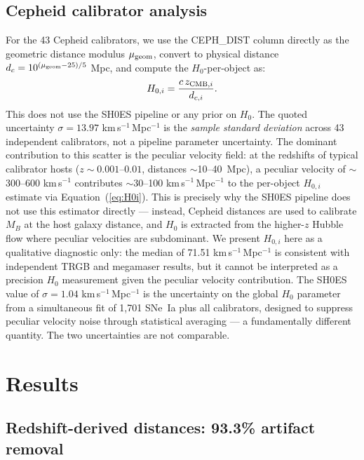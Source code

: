 \documentclass[usenatbib]{mnras}
\begin{document}
\subsection{Cepheid calibrator analysis}

For the 43 Cepheid calibrators, we use the CEPH\_DIST column directly
as the geometric distance modulus $\mu_{\rm geom}$, convert to physical
distance $d_c = 10^{(\mu_{\rm geom}-25)/5}$ Mpc, and compute the
$H_0$-per-object as:
\begin{equation}
H_{0,i} = \frac{c\,z_{{\rm CMB},i}}{d_{c,i}}.
\label{eq:H0i}
\end{equation}
This does not use the SH0ES pipeline or any prior on $H_0$. The quoted
uncertainty $\sigma = 13.97$ km\,s$^{-1}$\,Mpc$^{-1}$ is the
\emph{sample standard deviation} across 43 independent calibrators,
not a pipeline parameter uncertainty. The dominant contribution to
this scatter is the peculiar velocity field: at the redshifts of
typical calibrator hosts ($z \sim 0.001$--$0.01$, distances
$\sim$10--40~Mpc), a peculiar velocity of $\sim$300--600 km\,s$^{-1}$
contributes $\sim$30--100 km\,s$^{-1}$\,Mpc$^{-1}$ to the per-object
$H_{0,i}$ estimate via Equation~(\ref{eq:H0i}). This is precisely why
the SH0ES pipeline does not use this estimator directly --- instead,
Cepheid distances are used to calibrate $M_B$ at the host galaxy
distance, and $H_0$ is extracted from the higher-$z$ Hubble flow where
peculiar velocities are subdominant. We present $H_{0,i}$ here as a
qualitative diagnostic only: the median of 71.51 km\,s$^{-1}$\,Mpc$^{-1}$
is consistent with independent TRGB and megamaser results, but it
cannot be interpreted as a precision $H_0$ measurement given the
peculiar velocity contribution. The SH0ES value of
$\sigma = 1.04$ km\,s$^{-1}$\,Mpc$^{-1}$ is the uncertainty on the
global $H_0$ parameter from a simultaneous fit of 1,701 SNe~Ia plus
all calibrators, designed to suppress peculiar velocity noise through
statistical averaging --- a fundamentally different quantity.
The two uncertainties are not comparable.

\section{Results}

\subsection{Redshift-derived distances: 93.3\% artifact removal}
\end{document}
